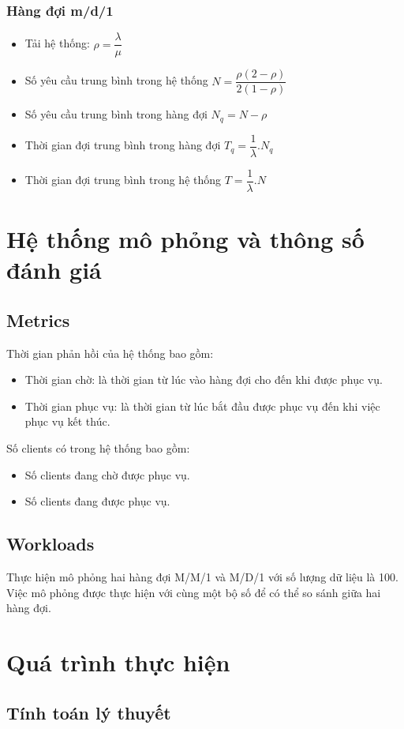 \documentclass[a4paper]{article}
\begin{document}
\subsubsection{Hàng đợi m/d/1}
\begin{itemize}
\item Tải hệ thống: $\rho = \dfrac{\lambda}{\mu}$
\item Số yêu cầu trung bình trong hệ thống $N=\dfrac{\rho(2-\rho)}{2(1-\rho)}$
\item Số yêu cầu trung bình trong hàng đợi $N_q=N-\rho$
\item Thời gian đợi trung bình trong hàng đợi $T_q=\dfrac{1}{\lambda}.N_q$
\item Thời gian đợi trung bình trong hệ thống $T=\dfrac{1}{\lambda}.N$
\end{itemize}
\section{Hệ thống mô phỏng và thông số đánh giá}
\subsection{Metrics}
Thời gian phản hồi của hệ thống bao gồm: 
\begin{itemize}
\item Thời gian chờ: là thời gian từ lúc vào hàng đợi cho đến khi được phục vụ.
\item Thời gian phục vụ: là thời gian từ lúc bắt đầu được phục vụ đến khi việc phục vụ kết thúc.
\end{itemize}
\par \noindent
Số clients có trong hệ thống bao gồm:
\begin{itemize}
\item Số clients đang chờ được phục vụ.
\item Số clients đang được phục vụ.
\end{itemize}
\subsection{Workloads}
Thực hiện mô phỏng hai hàng đợi M/M/1 và M/D/1 với số lượng dữ liệu là 100. Việc mô phỏng được thực hiện với cùng một bộ số để có thể so sánh giữa hai hàng đợi.
\section{Quá trình thực hiện}
\subsection{Tính toán lý thuyết}
\end{document}
